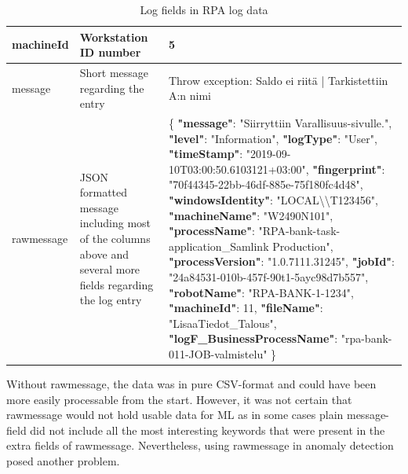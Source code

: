 \begin{table}[]
\begin{tabular}{|L{0.25\textwidth}|L{0.25\textwidth}|L{0.5\textwidth}|}
        machineId          & Workstation ID number                           & 5                                                                            \\ \hline
        message            & Short message regarding the entry               & Throw exception: Saldo ei riitä | \newline Tarkistettiin A:n nimi                    \\ \hline
        rawmessage         & JSON formatted message including most of the columns above and several more fields regarding the log entry &
        \{
        \textbf{"message"}: "Siirryttiin Varallisuus-sivulle.",\newline
        \textbf{"level"}: "Information",\newline
        \textbf{"logType"}: "User",\newline
        \textbf{"timeStamp"}: "2019-09-10T03:00:50.6103121+03:00",\newline
        \textbf{"fingerprint"}: "70f44345-22bb-46df-885e-75f180fc4d48",\newline
        \textbf{"windowsIdentity"}: "LOCAL\textbackslash{}\textbackslash{}T123456",\newline
        \textbf{"machineName"}: "W2490N101",\newline
        \textbf{"processName"}: "RPA-bank-task-application\_Samlink Production",\newline
        \textbf{"processVersion"}: "1.0.7111.31245",\newline
        \textbf{"jobId"}: "24a84531-010b-457f-90t1-5ayc98d7b557",\newline
        \textbf{"robotName"}: "RPA-BANK-1-1234",\newline
        \textbf{"machineId"}: 11,\newline
        \textbf{"fileName"}: "LisaaTiedot\_Talous",\newline
        \textbf{"logF\_BusinessProcessName"}: "rpa-bank-011-JOB-valmistelu"  \}
        \\ \hline
    \end{tabular}
    \caption{Log fields in RPA log data}
    \label{tab:log-row-fields}
\end{table}

Without rawmessage,
the data was in pure CSV-format
and could have been more easily processable from the start.
However,
it was not certain
that rawmessage would not hold usable data for ML
as in some cases plain message-field did not include
all the most interesting keywords that were present
in the extra fields of rawmessage.
Nevertheless,
using rawmessage in anomaly detection
posed another problem.

